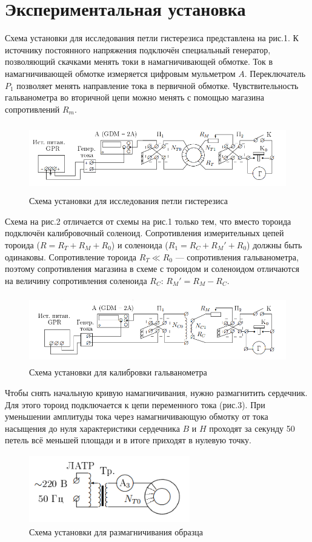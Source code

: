\documentclass[12pt]{article}
\begin{document}
\section*{Экспериментальная установка}
	Схема установки для исследования петли гистерезиса представлена на рис.1. К источнику постоянного напряжения подключён специальный генератор, позволяющий скачками менять токи в намагничивающей обмотке. Ток в намагничивающей обмотке измеряется цифровым мульметром $A$. Переключатель $P_1$ позволяет менять направление тока в первичной обмотке. Чувствительность гальванометра во вторичной цепи можно менять с помощью магазина сопротивлений $R_m$.
\begin{figure}[h!]
	\centering
	\includegraphics[height = 3cm, width = 12cm]{image1.png}
	\caption{Схема установки для исследования петли гистерезиса}
\end{figure}
\par
	Схема на рис.2 отличается от схемы на рис.1 только тем, что вместо тороида подключён калибровочный соленоид. Сопротивления измерительных цепей тороида ($R = R_T + R_M + R_0$) и соленоида ($R_1 = R_C + R_M' + R_0$) должны быть одинаковы. Сопротивление тороида $R_T \ll R_0$ --- сопротивления гальванометра, поэтому сопротивления магазина в схеме с тороидом и соленоидом отличаются на величину сопротивления соленоида $R_C$: $R_M' = R_M - R_C$.
\begin{figure}[h!]
	\centering
	\includegraphics[height = 3cm, width = 12cm]{image2.png}
	\caption{Схема установки для калибровки гальванометра}
\end{figure}
\par
	Чтобы снять начальную кривую намагничивания, нужно размагнитить сердечник. Для этого тороид подключается к цепи переменного тока	(рис.3). При уменьшении амплитуды тока через намагничивающую обмотку от тока насыщения до нуля характеристики сердечника $B$ и $H$ проходят за секунду 50 петель всё меньшей площади и в итоге приходят в нулевую точку.
\begin{figure}[h!]
	\centering
	\includegraphics[height = 3cm, width = 7cm]{image3.png}
	\caption{Схема установки для размагничивания образца}
\end{figure}
\end{document}
